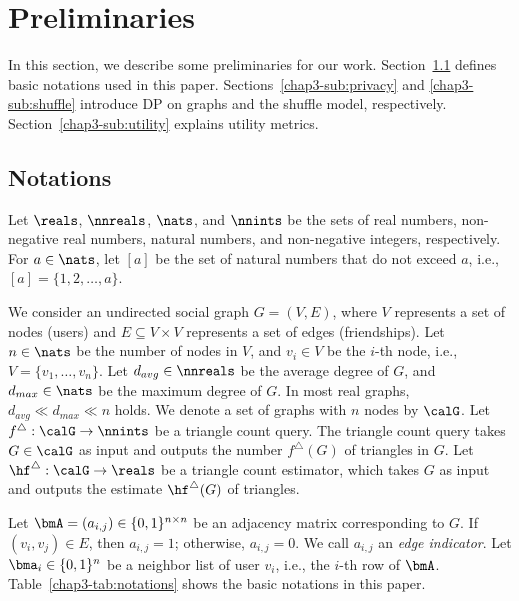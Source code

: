 \section{Preliminaries}
\label{chap3-sec:preliminaries}
In this section, we describe some preliminaries for our work. 
Section~\ref{chap3-sub:notations} defines basic notations used in this paper. 
Sections~\ref{chap3-sub:privacy} and \ref{chap3-sub:shuffle} introduce DP on graphs and the shuffle model, respectively. 
Section~\ref{chap3-sub:utility} explains utility metrics. 

\subsection{Notations}
\label{chap3-sub:notations}
Let $\reals$, $\nnreals$, $\nats$, and $\nnints$ be the sets of real numbers, non-negative real numbers, natural numbers, and non-negative integers, respectively. 
For $a\in\nats$, let $[a]$ be the set of natural numbers that do not exceed $a$, i.e., $[a] = \{1, 2, \ldots, a\}$. 

We consider an undirected social graph $G=(V,E)$, where $V$ represents a set of nodes (users) and $E \subseteq V \times V$ represents a set of edges (friendships). 
Let $n\in\nats$ be the number of nodes in $V$, and $v_i \in V$ be the $i$-th node, i.e., $V=\{v_1,\ldots,v_n\}$. 
Let $d_{avg} \in \nnreals$ be the average degree of $G$, and $d_{max} \in \nats$ be the maximum degree of $G$. 
In most real graphs, $d_{avg} \ll d_{max} \ll n$ holds. 
We denote a set of graphs with $n$ nodes by $\calG$. 
Let $f^\triangle: \calG \rightarrow \nnints$ be a triangle count query. 
The triangle count query takes $G \in \calG$ as input and outputs the number $f^\triangle(G)$ of triangles in $G$. 
Let $\hf^\triangle: \calG \rightarrow \reals$ be a triangle count estimator, which takes $G$ as input and outputs the estimate $\hf^\triangle(G)$ of triangles. 

Let $\bmA=(a_{i,j}) \in \{0,1\}^{n \times n}$ be 
an adjacency matrix corresponding to $G$. 
If $(v_i,v_j) \in E$, then $a_{i,j} = 1$; otherwise, $a_{i,j} = 0$. 
We call $a_{i,j}$ an \textit{edge indicator}. 
Let $\bma_i \in \{0,1\}^n$ be a neighbor list of user $v_i$, i.e., the $i$-th row of $\bmA$. 
Table~\ref{chap3-tab:notations} shows the basic notations in this paper. 

